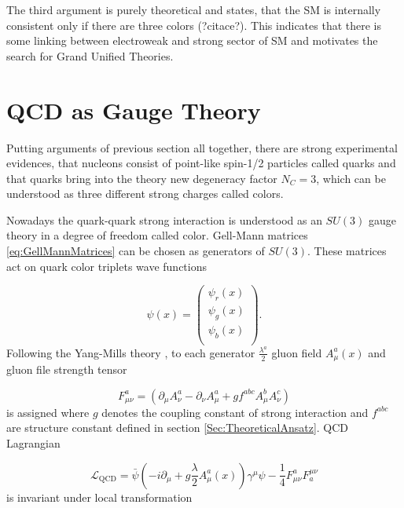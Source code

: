 \documentclass[a4paper,11pt]{report}
\begin{document}
The third argument is purely theoretical and states, that the SM is internally
consistent only if there are three colors (?citace?). This indicates that there
is some linking between electroweak and strong sector of SM and motivates the
search for Grand Unified Theories.

\section{QCD as Gauge Theory}

Putting arguments of previous section all together, there are strong
experimental evidences, that nucleons consist of point-like spin-1/2 particles
called quarks and that quarks bring into the theory new degeneracy factor $N_C =
3$, which can be understood as three different strong charges called colors.

Nowadays the quark-quark strong interaction is understood as an $SU(3)$ gauge theory in
a degree of freedom called color. Gell-Mann matrices \eqref{eq:GellMannMatrices}
can be chosen as generators of $SU(3)$. These matrices act on quark color
triplets wave functions

\begin{equation}
  \psi(x) = \begin{pmatrix}  
    \psi_r(x) \\ \psi_g(x) \\ \psi_b(x) \\ 
            \end{pmatrix}.
  \label{eq:QuarkWaveFunction}
\end{equation}
Following the Yang-Mills theory \cite{YangMill}, to each generator
$\frac{\lambda^a}{2}$ gluon field $A_\mu^a(x)$ and gluon file strength tensor

\begin{equation}
  F_{\mu\nu}^a = \left( \partial_\mu A_\nu^a - \partial_\nu A_\mu^a + g f^{abc}
  A_\mu^b A_\nu^c \right)
  \label{eq:GluonFieldStrengthTensor}
\end{equation}
is assigned where $g$ denotes the coupling constant of strong interaction and
$f^{abc}$ are structure constant defined in section \ref{Sec:TheoreticalAnsatz}.
QCD Lagrangian

\begin{equation}
  \mathscr{L}_{\text{QCD}} = \bar{\psi} \left( -i \partial_\mu + g \frac{\lambda}{2}
  A_\mu^a(x) \right) \gamma^\mu \psi - \frac{1}{4}F_{\mu\nu}^aF_a^{\mu\nu}
  \label{eq:QCDLagrangian}
\end{equation}
is invariant under local transformation
\end{document}
